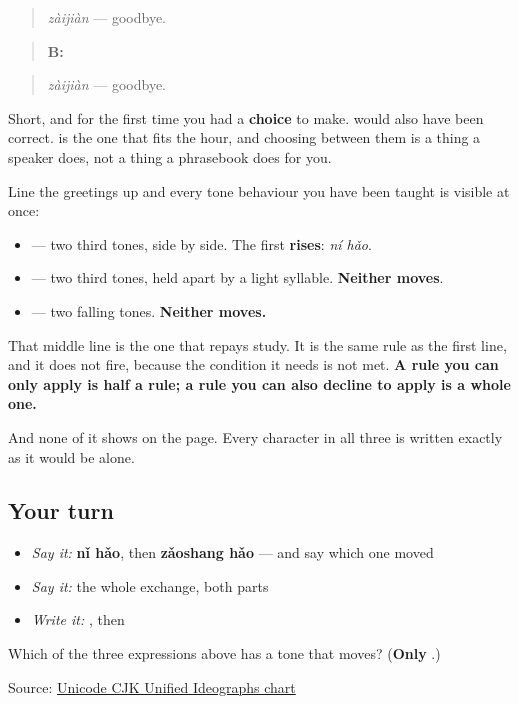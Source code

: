 \begin{quote}
\emph{zàijiàn} — goodbye.
\end{quote}

\begin{quote}
\textbf{B:} 
\end{quote}

\begin{quote}
\emph{zàijiàn} — goodbye.
\end{quote}

Short, and for the first time you had a \textbf{choice} to make.  would also have been correct.  is the one that fits the hour, and choosing between them is a thing a speaker does, not a thing a phrasebook does for you.

\begin{grammarlens}[title={What you've built — three tones, three behaviours}]
Line the greetings up and every tone behaviour you have been taught is visible at once:

\begin{itemize}
\raggedright
  \item \textbf{} — two third tones, side by side. The first \textbf{rises}: \emph{ní hǎo}.
  \item \textbf{} — two third tones, held apart by a light syllable. \textbf{Neither moves}.
  \item \textbf{} — two falling tones. \textbf{Neither moves.}
\end{itemize}

That middle line is the one that repays study. It is the same rule as the first line, and it does not fire, because the condition it needs is not met. \textbf{A rule you can only apply is half a rule; a rule you can also decline to apply is a whole one.}

And none of it shows on the page. Every character in all three is written exactly as it would be alone.
\end{grammarlens}

\subsection*{Your turn}
\begin{itemize}
\raggedright
  \item \emph{Say it:} \textbf{nǐ hǎo}, then \textbf{zǎoshang hǎo} — and say which one moved
  \item \emph{Say it:} the whole exchange, both parts
  \item \emph{Write it:} , then 
\end{itemize}

\begin{tcolorbox}[breakable,colback=teal!4,colframe=teal!35!black,title={Before you move on}]
Which of the three expressions above has a tone that moves? (\textbf{Only }.)

Source: \href{https://www.unicode.org/charts/PDF/U4E00.pdf}{Unicode CJK Unified Ideographs chart}
\end{tcolorbox}
